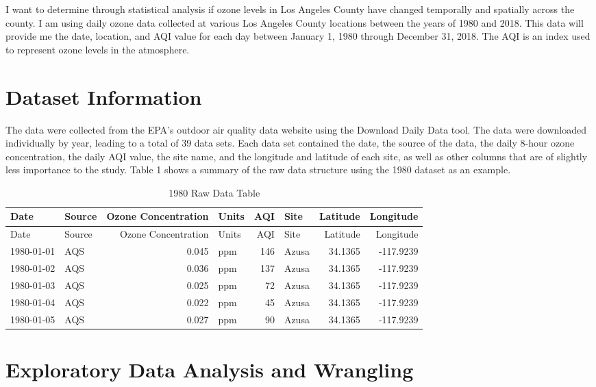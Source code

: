 \documentclass[12pt,]{article}
\begin{document}
I want to determine through statistical analysis if ozone levels in Los
Angeles County have changed temporally and spatially across the county.
I am using daily ozone data collected at various Los Angeles County
locations between the years of 1980 and 2018. This data will provide me
the date, location, and AQI value for each day between January 1, 1980
through December 31, 2018. The AQI is an index used to represent ozone
levels in the atmosphere.

\newpage

\section{Dataset Information}\label{dataset-information}

The data were collected from the EPA's outdoor air quality data website
using the Download Daily Data tool. The data were downloaded
individually by year, leading to a total of 39 data sets. Each data set
contained the date, the source of the data, the daily 8-hour ozone
concentration, the daily AQI value, the site name, and the longitude and
latitude of each site, as well as other columns that are of slightly
less importance to the study. Table 1 shows a summary of the raw data
structure using the 1980 dataset as an example.

\begin{longtable}[]{@{}llrlrlrr@{}}
\caption{1980 Raw Data Table}\tabularnewline
\toprule
Date & Source & Ozone Concentration & Units & AQI & Site & Latitude &
Longitude\tabularnewline
\midrule
\endfirsthead
\toprule
Date & Source & Ozone Concentration & Units & AQI & Site & Latitude &
Longitude\tabularnewline
\midrule
\endhead
1980-01-01 & AQS & 0.045 & ppm & 146 & Azusa & 34.1365 &
-117.9239\tabularnewline
1980-01-02 & AQS & 0.036 & ppm & 137 & Azusa & 34.1365 &
-117.9239\tabularnewline
1980-01-03 & AQS & 0.025 & ppm & 72 & Azusa & 34.1365 &
-117.9239\tabularnewline
1980-01-04 & AQS & 0.022 & ppm & 45 & Azusa & 34.1365 &
-117.9239\tabularnewline
1980-01-05 & AQS & 0.027 & ppm & 90 & Azusa & 34.1365 &
-117.9239\tabularnewline
\bottomrule
\end{longtable}

\newpage

\section{Exploratory Data Analysis and
Wrangling}\label{exploratory-data-analysis-and-wrangling}
\end{document}
